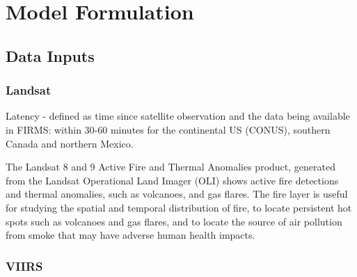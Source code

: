\documentclass[preprint,review, 11pt,3p,authoryear]{elsarticle}
\begin{document}
\section{Model Formulation}
\label{model}



\subsection{Data Inputs}



\subsubsection{Landsat}
Latency - defined as time since satellite observation and the data being available in FIRMS:
within 30-60 minutes for the continental US (CONUS), southern Canada and northern Mexico.

The Landsat 8 and 9 Active Fire and Thermal Anomalies product, generated from the Landsat Operational Land Imager (OLI) shows active fire detections and thermal anomalies, such as volcanoes, and gas flares. The fire layer is useful for studying the spatial and temporal distribution of fire, to locate persistent hot spots such as volcanoes and gas flares, and to locate the source of air pollution from smoke that may have adverse human health impacts.

\subsubsection{VIIRS}
\end{document}
